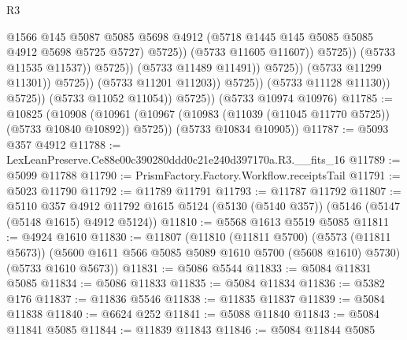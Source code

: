 \begin{lexlean}{R3}
\begin{coremodule}
                                                  @1566
                                                  @145
                                                  @5087
                                                  @5085
                                                  @5698
                                                  @4912
                                                  (@5718
                                                    @1445
                                                    @145
                                                    @5085
                                                    @5085
                                                    @4912
                                                    @5698
                                                    @5725
                                                    @5727)
                                                  @5725))
                                              (@5733 @11605 @11607))
                                            @5725))
                                        (@5733 @11535 @11537))
                                      @5725))
                                  (@5733 @11489 @11491))
                                @5725))
                            (@5733 @11299 @11301))
                          @5725))
                      (@5733 @11201 @11203))
                    @5725))
                (@5733 @11128 @11130))
              @5725))
          (@5733 @11052 @11054))
        @5725))
    (@5733 @10974 @10976)
@11785 := @10825
    (@10908
      (@10961 (@10967 (@10983 (@11039 (@11045 @11770 @5725)) (@5733 @10840 @10892)) @5725))
      (@5733 @10834 @10905))
@11787 := @5093 @357 @4912
@11788 := LexLeanPreserve.Ce88e00c390280ddd0c21e240d397170a.R3.__fits_16
@11789 := @5099 @11788
@11790 := PrismFactory.Factory.Workflow.receiptsTail
@11791 := @5023 @11790
@11792 := @11789 @11791
@11793 := @11787 @11792
@11807 := @5110
    @357
    @4912
    @11792
    @1615
    @5124
    (@5130 (@5140 @357))
    (@5146 (@5147 (@5148 @1615) @4912 @5124))
@11810 := @5568 @1613 @5519 @5085
@11811 := @4924 @1610
@11830 := @11807
    (@11810
      (@11811 @5700)
      (@5573 (@11811 @5673))
      (@5600 @1611 @566 @5085 @5089 @1610 @5700 (@5608 @1610) @5730)
      (@5733 @1610 @5673))
@11831 := @5086 @5544
@11833 := @5084 @11831 @5085
@11834 := @5086 @11833
@11835 := @5084 @11834
@11836 := @5382 @176
@11837 := @11836 @5546
@11838 := @11835 @11837
@11839 := @5084 @11838
@11840 := @6624 @252
@11841 := @5088 @11840
@11843 := @5084 @11841 @5085
@11844 := @11839 @11843
@11846 := @5084 @11844 @5085

\end{coremodule}
\end{lexlean}
